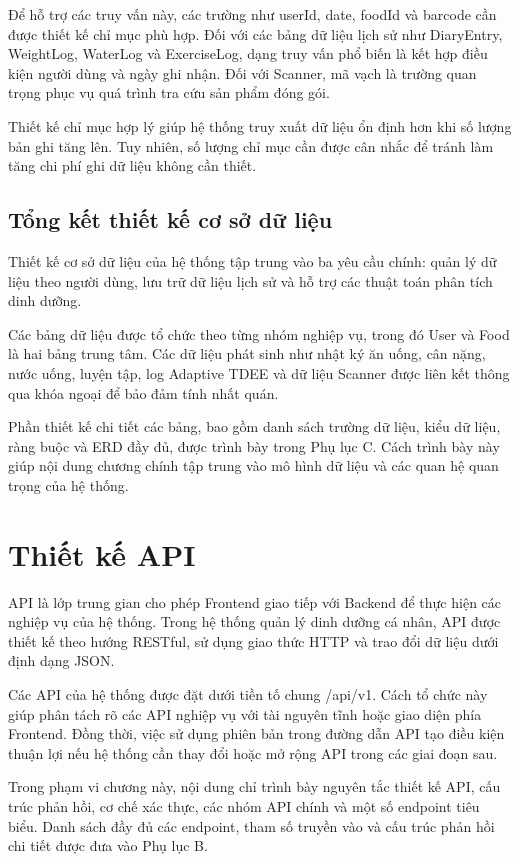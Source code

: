 \documentclass[12pt, a4paper]{report}
\begin{document}
Để hỗ trợ các truy vấn này, các trường như userId, date, foodId và barcode cần được thiết kế chỉ mục phù hợp. Đối với các bảng dữ liệu lịch sử như DiaryEntry, WeightLog, WaterLog và ExerciseLog, dạng truy vấn phổ biến là kết hợp điều kiện người dùng và ngày ghi nhận. Đối với Scanner, mã vạch là trường quan trọng phục vụ quá trình tra cứu sản phẩm đóng gói.

Thiết kế chỉ mục hợp lý giúp hệ thống truy xuất dữ liệu ổn định hơn khi số lượng bản ghi tăng lên. Tuy nhiên, số lượng chỉ mục cần được cân nhắc để tránh làm tăng chi phí ghi dữ liệu không cần thiết.

\subsection{Tổng kết thiết kế cơ sở dữ liệu}Thiết kế cơ sở dữ liệu của hệ thống tập trung vào ba yêu cầu chính: quản lý dữ liệu theo người dùng, lưu trữ dữ liệu lịch sử và hỗ trợ các thuật toán phân tích dinh dưỡng.

Các bảng dữ liệu được tổ chức theo từng nhóm nghiệp vụ, trong đó User và Food là hai bảng trung tâm. Các dữ liệu phát sinh như nhật ký ăn uống, cân nặng, nước uống, luyện tập, log Adaptive TDEE và dữ liệu Scanner được liên kết thông qua khóa ngoại để bảo đảm tính nhất quán.

Phần thiết kế chi tiết các bảng, bao gồm danh sách trường dữ liệu, kiểu dữ liệu, ràng buộc và ERD đầy đủ, được trình bày trong Phụ lục C. Cách trình bày này giúp nội dung chương chính tập trung vào mô hình dữ liệu và các quan hệ quan trọng của hệ thống.

\section{Thiết kế API}API là lớp trung gian cho phép Frontend giao tiếp với Backend để thực hiện các nghiệp vụ của hệ thống. Trong hệ thống quản lý dinh dưỡng cá nhân, API được thiết kế theo hướng RESTful, sử dụng giao thức HTTP và trao đổi dữ liệu dưới định dạng JSON.

Các API của hệ thống được đặt dưới tiền tố chung /api/v1. Cách tổ chức này giúp phân tách rõ các API nghiệp vụ với tài nguyên tĩnh hoặc giao diện phía Frontend. Đồng thời, việc sử dụng phiên bản trong đường dẫn API tạo điều kiện thuận lợi nếu hệ thống cần thay đổi hoặc mở rộng API trong các giai đoạn sau.

Trong phạm vi chương này, nội dung chỉ trình bày nguyên tắc thiết kế API, cấu trúc phản hồi, cơ chế xác thực, các nhóm API chính và một số endpoint tiêu biểu. Danh sách đầy đủ các endpoint, tham số truyền vào và cấu trúc phản hồi chi tiết được đưa vào Phụ lục B.
\end{document}
